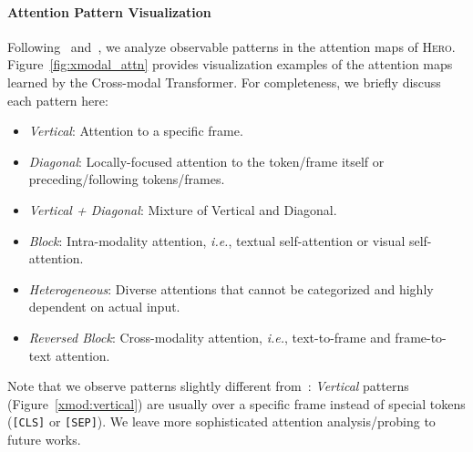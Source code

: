 \documentclass[11pt,a4paper]{article}
\begin{document}
\paragraph{Attention Pattern Visualization} Following~\citet{kovaleva2019revealing} and~\citet{chen2019uniter}, we analyze observable patterns in the attention maps of \textsc{Hero}.
Figure~\ref{fig:xmodal_attn} provides visualization examples of the attention maps learned by the Cross-modal Transformer.
For completeness, we briefly discuss each pattern here:
\begin{itemize}
  \item \textit{Vertical}: Attention to a specific frame.
  \item \textit{Diagonal}: Locally-focused attention to the token/frame itself or preceding/following tokens/frames.
  \item \textit{Vertical + Diagonal}: Mixture of Vertical and Diagonal.
  \item \textit{Block}: Intra-modality attention, \textit{i.e.}, textual self-attention or visual self-attention.
  \item \textit{Heterogeneous}: Diverse attentions that cannot be categorized and highly dependent on actual input.
  \item \textit{Reversed Block}: Cross-modality attention, \textit{i.e.}, text-to-frame and frame-to-text attention.
\end{itemize}

Note that we observe patterns slightly different from~\citet{chen2019uniter}: \textit{Vertical} patterns (Figure~\ref{xmod:vertical}) are usually over a specific frame instead of special tokens (\texttt{[CLS]} or \texttt{[SEP]}).
We leave more sophisticated attention analysis/probing to future works.
\end{document}
